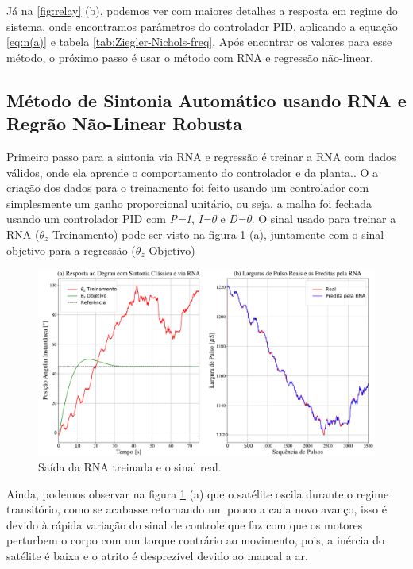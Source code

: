 Já na  \ref{fig:relay} (b), podemos ver com maiores detalhes a resposta em regime do sistema, onde encontramos parâmetros do controlador PID, aplicando a equação \ref{eq:n(a)} e tabela \ref{tab:Ziegler-Nichols-freq}. Após encontrar os valores para esse método, o próximo passo é usar o método com RNA e regressão não-linear.



\subsection{Método de Sintonia Automático usando RNA e Regrão Não-Linear Robusta}

Primeiro passo para a sintonia via RNA e regressão é treinar a RNA com dados válidos, onde ela aprende o comportamento do controlador e da planta.. O a criação dos dados para o treinamento foi feito usando um controlador com simplesmente um ganho proporcional unitário, ou seja, a malha foi fechada usando um controlador PID com \textit{P=1}, \textit{I=0} e \textit{D=0}. O sinal usado para treinar a RNA ($\theta_z$ Treinamento) pode ser visto na figura \ref{fig:neural_output} (a), juntamente com o sinal objetivo para a regressão ($\theta_z$ Objetivo)

\begin{figure}[H]
  \caption{Saída da RNA treinada e o sinal real.}
  \begin{center}
      \includegraphics[scale=0.35]{resultados/img/neural_output}
  \end{center}
  \label{fig:neural_output}
\end{figure}

Ainda, podemos observar na figura \ref{fig:neural_output} (a) que o satélite oscila durante o regime transitório, como se acabasse retornando um pouco a cada novo avanço, isso é devido à rápida variação do sinal de controle que faz com que os motores perturbem o corpo com um torque contrário ao movimento, pois, a inércia do satélite é baixa e o atrito é desprezível devido ao mancal a ar. 

